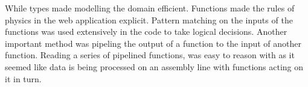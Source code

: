 While types made modelling the domain efficient. Functions made the rules of
physics in the web application explicit. Pattern matching on the inputs of the
functions was used extensively in the code to take logical decisions. Another
important method was pipeling the output of a function to the input of another
function. Reading a series of pipelined functions, was easy to reason with as
it seemed like data is being processed on an assembly line with functions
acting on it in turn.

